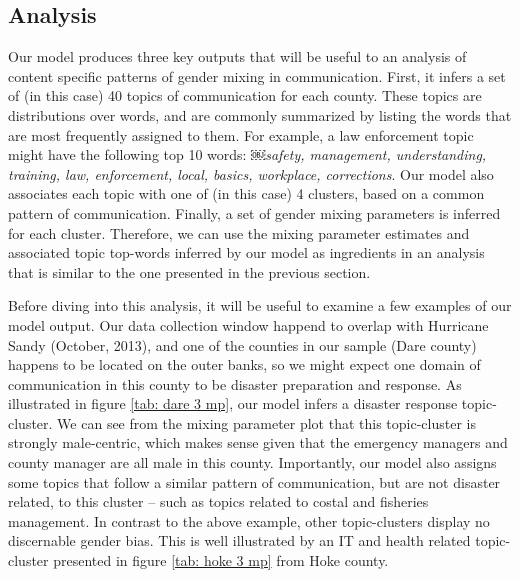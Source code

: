 \documentclass{pnastwo}
\begin{document}
\begin{article}
\subsection{Analysis}
Our model produces three key outputs that will be useful to an analysis of content specific patterns of gender mixing in communication. First, it infers a set of (in this case) 40 topics of communication for each county. These topics are distributions over words, and are commonly summarized by listing the words that are most frequently assigned to them. For example, a law enforcement topic might have the following top 10 words:
￼\emph{safety, management, understanding, training, law, enforcement, local, basics, workplace, corrections}. Our model also associates each topic with one of (in this case) 4 clusters, based on a common pattern of communication. Finally, a set of gender mixing parameters is inferred for each cluster. Therefore, we can use the mixing parameter estimates and associated topic top-words inferred by our model as ingredients in an analysis that is similar to the one presented in the previous section.

Before diving into this analysis, it will be useful to examine a few examples of our model output. Our data collection window happend to overlap with Hurricane Sandy (October, 2013), and one of the counties in our sample (Dare county) happens to be located on the outer banks, so we might expect one domain of communication in this county to be disaster preparation and response. As illustrated in figure \ref{tab: dare 3 mp}, our model infers a disaster response topic-cluster. We can see from the mixing parameter plot that this topic-cluster is strongly male-centric, which makes sense given that the emergency managers and county manager are all male in this county. Importantly, our model also assigns some topics that follow a similar pattern of communication, but are not disaster related, to this cluster -- such as topics related to costal and fisheries management.  In contrast to the above example, other topic-clusters display no discernable gender bias. This is well illustrated by an IT and health related topic-cluster presented in figure \ref{tab: hoke 3 mp} from Hoke county.


\end{article}
\end{document}
